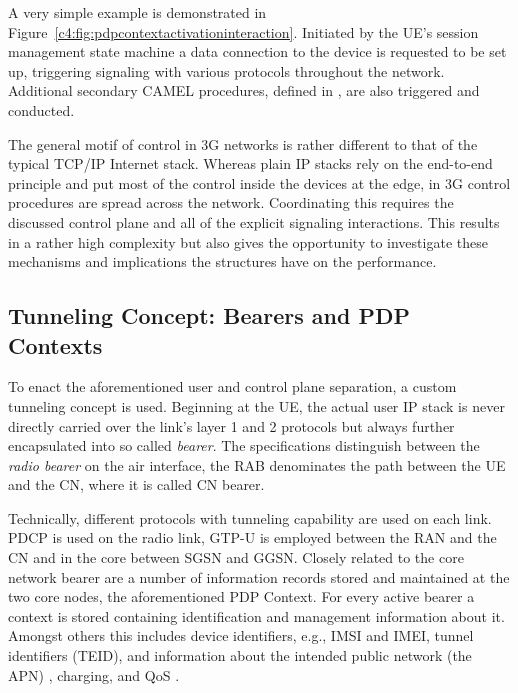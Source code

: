 A very simple example is demonstrated in Figure~\ref{c4:fig:pdpcontextactivationinteraction}. Initiated by the \gls{UE}'s session management state machine a data connection to the device is requested to be set up, triggering signaling with various protocols throughout the network. Additional secondary \gls{CAMEL} procedures, defined in \cite{3gpp.23.078}, are also triggered and conducted.

The general motif of control in \gls{3G} networks is rather different to that of the typical \gls{TCP}/\gls{IP} Internet stack. Whereas plain \gls{IP} stacks rely on the end-to-end principle and put most of the control inside the devices at the edge, in \gls{3G} control procedures are spread across the network. Coordinating this requires the discussed control plane and all of the explicit signaling interactions. This results in a rather high complexity but also gives the opportunity to investigate these mechanisms and implications the structures have on the performance.


\subsection{Tunneling Concept: Bearers and \texorpdfstring{\acrshort{PDP}}{PDP} Contexts}

To enact the aforementioned user and control plane separation, a custom tunneling concept is used. Beginning at the \gls{UE}, the actual user \gls{IP} stack is never directly carried over the link's layer 1 and 2 protocols but always further encapsulated into so called \textit{bearer}. The specifications distinguish between the \textit{radio bearer} on the air interface, the \gls{RAB} denominates the path between the \gls{UE} and the \gls{CN}, where it is called \gls{CN} bearer.

Technically, different protocols with tunneling capability are used on each link. \gls{PDCP} is used on the radio link, \gls{GTP-U} is employed between the \gls{RAN} and the \gls{CN} and in the core between \gls{SGSN} and \gls{GGSN}. Closely related to the core network bearer are a number of information records stored and maintained at the two core nodes, the aforementioned \gls{PDP} Context. For every active bearer a context is stored containing identification and management information about it. Amongst others this includes device identifiers, e.g., \gls{IMSI} and \gls{IMEI}, tunnel identifiers (\gls{TEID}), and information about the intended public network (the \gls{APN}) , charging, and \gls{QoS} \cite[Section~13]{3gpp.23.060}.

